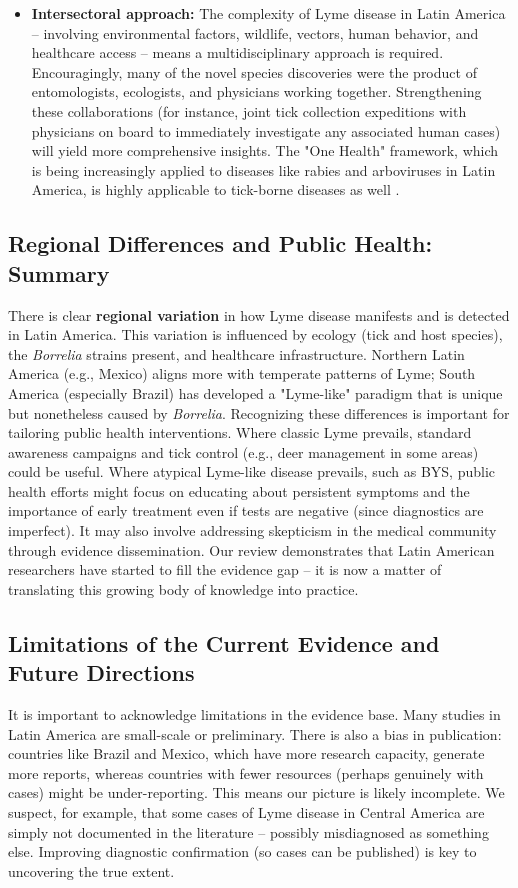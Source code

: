 \documentclass[11pt,letterpaper]{article}
\begin{document}
\begin{itemize}
    \item \textbf{Intersectoral approach:} The complexity of Lyme disease in Latin America – involving environmental factors, wildlife, vectors, human behavior, and healthcare access – means a multidisciplinary approach is required. Encouragingly, many of the novel species discoveries were the product of entomologists, ecologists, and physicians working together. Strengthening these collaborations (for instance, joint tick collection expeditions with physicians on board to immediately investigate any associated human cases) will yield more comprehensive insights. The "One Health" framework, which is being increasingly applied to diseases like rabies and arboviruses in Latin America, is highly applicable to tick-borne diseases as well \citep{Colunga-Salas2022e, Colunga-Salas2022f}.
\end{itemize}

\subsection{Regional Differences and Public Health: Summary}
There is clear \textbf{regional variation} in how Lyme disease manifests and is detected in Latin America. This variation is influenced by ecology (tick and host species), the \textit{Borrelia} strains present, and healthcare infrastructure. Northern Latin America (e.g., Mexico) aligns more with temperate patterns of Lyme; South America (especially Brazil) has developed a "Lyme-like" paradigm that is unique but nonetheless caused by \textit{Borrelia}. Recognizing these differences is important for tailoring public health interventions. Where classic Lyme prevails, standard awareness campaigns and tick control (e.g., deer management in some areas) could be useful. Where atypical Lyme-like disease prevails, such as BYS, public health efforts might focus on educating about persistent symptoms and the importance of early treatment even if tests are negative (since diagnostics are imperfect). It may also involve addressing skepticism in the medical community through evidence dissemination. Our review demonstrates that Latin American researchers have started to fill the evidence gap – it is now a matter of translating this growing body of knowledge into practice.

\subsection{Limitations of the Current Evidence and Future Directions}
It is important to acknowledge limitations in the evidence base. Many studies in Latin America are small-scale or preliminary. There is also a bias in publication: countries like Brazil and Mexico, which have more research capacity, generate more reports, whereas countries with fewer resources (perhaps genuinely with cases) might be under-reporting. This means our picture is likely incomplete. We suspect, for example, that some cases of Lyme disease in Central America are simply not documented in the literature – possibly misdiagnosed as something else. Improving diagnostic confirmation (so cases can be published) is key to uncovering the true extent.
\end{document}
